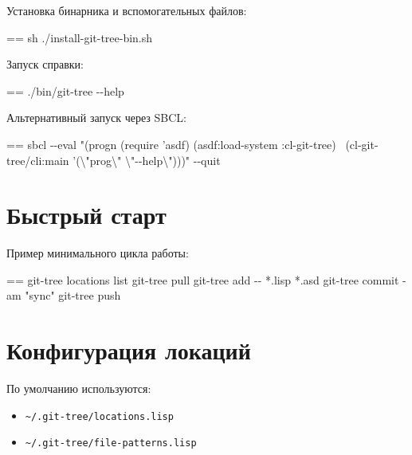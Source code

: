 \documentclass{book}
\makeatletter
\newenvironment{Texinfopreformatted}{%
  \par\GNUTobeylines\obeyspaces\frenchspacing\parskip=\z@\parindent=\z@}{}
{\catcode`\^^M=13 \gdef\GNUTobeylines{\catcode`\^^M=13 \def^^M{\null\par}}}
\newenvironment{Texinfoindented}{\begin{list}{}{}\item\relax}{\end{list}}
\renewcommand{\_}{\Texinfounderscore\discretionary{}{}{}}
\makeatother
\begin{document}
Установка бинарника и вспомогательных файлов:
\begin{Texinfoindented}
\begin{Texinfopreformatted}%
\ttfamily sh ./install-git-tree-bin.sh
\end{Texinfopreformatted}
\end{Texinfoindented}

Запуск справки:
\begin{Texinfoindented}
\begin{Texinfopreformatted}%
\ttfamily ./bin/git-tree {-}{-}help
\end{Texinfopreformatted}
\end{Texinfoindented}

Альтернативный запуск через SBCL:
\begin{Texinfoindented}
\begin{Texinfopreformatted}%
\ttfamily sbcl {-}{-}eval "(progn (require 'asdf) (asdf:load-system :cl-git-tree)
\  (cl-git-tree/cli:main '(\textbackslash{}"prog\textbackslash{}" \textbackslash{}"{-}{-}help\textbackslash{}")))" {-}{-}quit
\end{Texinfopreformatted}
\end{Texinfoindented}

\chapter{{Быстрый старт}}
\label{anchor:_0411_044b_0441_0442_0440_044b_0439-_0441_0442_0430_0440_0442}%

Пример минимального цикла работы:
\begin{Texinfoindented}
\begin{Texinfopreformatted}%
\ttfamily git-tree locations list
git-tree pull
git-tree add {-}{-} *.lisp *.asd
git-tree commit -am "sync"
git-tree push
\end{Texinfopreformatted}
\end{Texinfoindented}

\chapter{{Конфигурация локаций}}
\label{anchor:_041a_043e_043d_0444_0438_0433_0443_0440_0430_0446_0438_044f-_043b_043e_043a_0430_0446_0438_0439}%

По умолчанию используются:
\begin{itemize}[label=\textbullet{}]
\item \texttt{\~{}/.git-tree/locations.lisp}
\item \texttt{\~{}/.git-tree/file-patterns.lisp}
\end{itemize}
\end{document}
